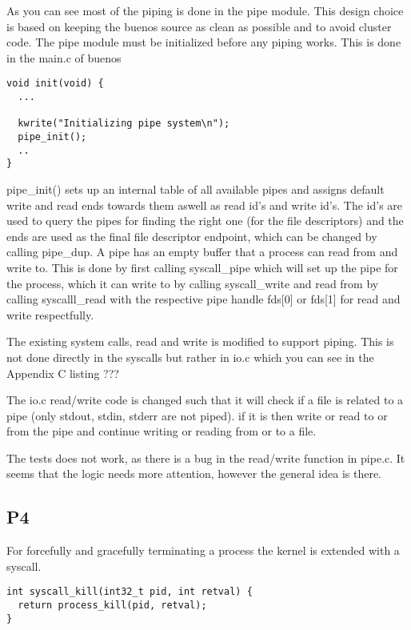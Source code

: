 \documentclass[12pt]{article}
\begin{document}
As you can see most of the piping is done in the pipe module. This design choice is based on keeping the buenos source as clean as possible and to avoid cluster code. The pipe module must be initialized before any piping works. This is done in the main.c of buenos

\begin{lstlisting}[caption=main.c]
void init(void) {
  ...

  kwrite("Initializing pipe system\n");
  pipe_init();
  ..
}
\end{lstlisting}

pipe\_init() sets up an internal table of all available pipes and assigns default write and read ends towards them aswell as read id's and write id's. The id's are used to query the pipes for finding the right one (for the file descriptors) and the ends are used as the final file descriptor endpoint, which can be changed by calling pipe\_dup. A pipe has an empty buffer that a process can read from and write to. This is done by first calling syscall\_pipe which will set up the pipe for the process, which it can write to by calling syscall\_write and read from by calling syscalll\_read with the respective pipe handle fds[0] or fds[1] for read and write respectfully. 

The existing system calls, read and write is modified to support piping. This is not done directly in the syscalls but rather in io.c which you can see in the Appendix C listing ???

The io.c read/write code is changed such that it will check if a file is related to a pipe (only stdout, stdin, stderr are not piped). if it is then write or read to or from the pipe and continue writing or reading from or to a file.  

The tests does not work, as there is a bug in the read/write function in pipe.c. It seems that the logic needs more attention, however the general idea is there. 

\subsection{P4}

For forcefully and gracefully terminating a process the kernel is extended with a syscall.

\begin{lstlisting}[caption=syscall.c]
int syscall_kill(int32_t pid, int retval) {
  return process_kill(pid, retval);
}
\end{lstlisting}
\end{document}
